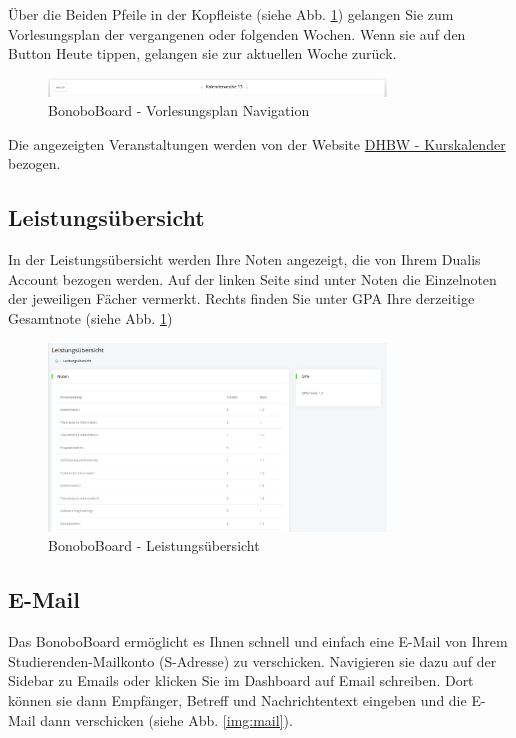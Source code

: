 \documentclass[a4paper,11pt]{scrartcl}
\begin{document}
Über die Beiden Pfeile in der Kopfleiste (siehe Abb. \ref{img:lecture_nav}) gelangen Sie zum Vorlesungsplan der vergangenen oder folgenden Wochen. Wenn sie auf den Button \frqq{}Heute\flqq{} tippen, gelangen sie zur aktuellen Woche zurück.

\begin{figure}[H]
	\begin{center}
		\includegraphics[width=0.8\textwidth]{lecture_nav}
		\caption{BonoboBoard - Vorlesungsplan Navigation}
		\label{img:lecture_nav}
	\end{center}
\end{figure}
\noindent

Die angezeigten Veranstaltungen werden von der Website \frqq{}\href{https://vorlesungsplan.dhbw-mannheim.de/index.php}{DHBW - Kurskalender}\flqq{} bezogen.


\subsection{Leistungsübersicht}
In der Leistungsübersicht werden Ihre Noten angezeigt, die von Ihrem Dualis Account bezogen werden. Auf der linken Seite sind unter \frqq{}Noten\flqq{} die Einzelnoten der jeweiligen Fächer vermerkt. Rechts finden Sie unter \frqq{}GPA\flqq{} Ihre derzeitige Gesamtnote (siehe Abb. \ref{img:lecture_nav})

\begin{figure}[H]
	\begin{center}
		\includegraphics[width=0.8\textwidth]{dualis}
		\caption{BonoboBoard - Leistungsübersicht}
		\label{img:dualis}
	\end{center}
\end{figure}
\noindent

\subsection{E-Mail}
\label{sec:email}
Das BonoboBoard ermöglicht es Ihnen schnell und einfach eine E-Mail von Ihrem Studierenden-Mailkonto (\frqq{}S-Adresse\flqq{}) zu verschicken. Navigieren sie dazu auf der Sidebar zu \frqq{}Emails\flqq{} oder klicken Sie im Dashboard auf \frqq{}Email schreiben\flqq{}. Dort können sie dann Empfänger, Betreff und Nachrichtentext eingeben und die E-Mail dann verschicken (siehe Abb. \ref{img:mail}).
 
\end{document}
